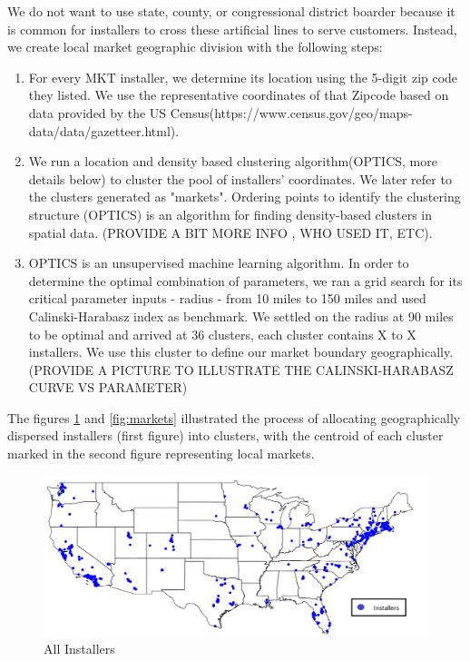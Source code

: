 \documentclass[msom,blindrev]{informs3}
\begin{document}
We do not want to use state, county, or congressional district boarder because it is common for installers to cross these artificial lines to serve customers. Instead, we create local market geographic division with the following steps:  
\begin{enumerate}
	\item For every MKT installer, we determine its location using the 5-digit zip code they listed. We use the representative coordinates of that Zipcode based on data provided by the US Census(https://www.census.gov/geo/maps-data/data/gazetteer.html). 
	\item  We run a location and density based clustering algorithm(OPTICS, more details below) to cluster the pool of installers' coordinates. We later refer to the clusters generated as "markets".  Ordering points to identify the clustering structure (OPTICS) is an algorithm for finding density-based clusters in spatial data. (PROVIDE A BIT MORE INFO , WHO USED IT, ETC).   
	\item OPTICS is an unsupervised machine learning algorithm. In order to determine the optimal combination of parameters, we ran a grid search for its critical parameter inputs - radius - from 10 miles to 150 miles and used Calinski-Harabasz index as benchmark. We settled on the radius at 90 miles to be optimal and arrived at 36 clusters, each cluster contains X to X installers. We use this cluster to define our market boundary geographically. (PROVIDE A PICTURE TO ILLUSTRATE THE CALINSKI-HARABASZ CURVE VS PARAMETER) 
\end{enumerate}
The figures \ref{fig:nationalinstallers} and \ref{fig:markets} illustrated the process of allocating geographically dispersed installers (first figure) into clusters, with the centroid of each cluster marked in the second figure representing local markets. 
\begin{figure}
	\centering
	\includegraphics[width=1.1\linewidth]{national_installers.png}
	\caption{All Installers}
	\label{fig:nationalinstallers}
\end{figure}
\end{document}
